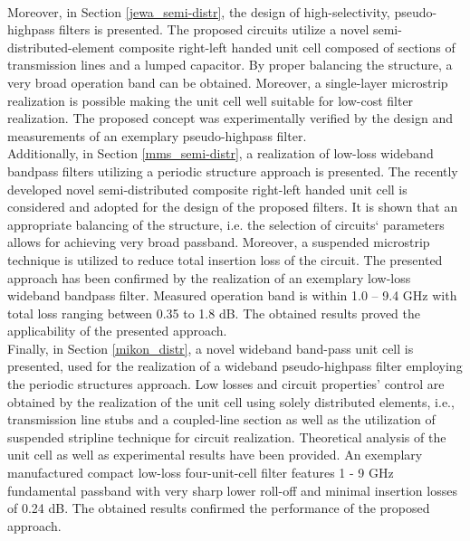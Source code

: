 \\
\indent Moreover, in Section \ref{jewa_semi-distr}, the design of high-selectivity, pseudo-highpass filters is presented. The proposed circuits utilize a novel semi-distributed-element composite right-left handed unit cell composed of sections of transmission lines and a lumped capacitor. By proper balancing the structure, a very broad operation band can be obtained. Moreover, a single-layer microstrip realization is possible making the unit cell well suitable for low-cost filter realization. The proposed concept was experimentally verified by the design and measurements of an exemplary pseudo-highpass filter.
\\
\indent Additionally, in Section \ref{mms_semi-distr}, a realization of low-loss wideband bandpass filters utilizing a periodic structure approach is presented. The recently developed novel semi-distributed composite right-left handed unit cell is considered and adopted for the design of the proposed filters. It is shown that an appropriate balancing of the structure, i.e. the  selection of circuits` parameters allows for achieving very broad passband. Moreover, a suspended microstrip technique is utilized to reduce total insertion loss of the circuit. The presented approach has been confirmed by the realization of an exemplary low-loss wideband bandpass filter. Measured operation band is within 1.0 – 9.4 GHz with total loss ranging between 0.35 to 1.8 dB. The obtained results proved the applicability of the presented approach.
\\
\indent Finally, in Section \ref{mikon_distr}, a novel wideband band-pass unit cell is presented, used for the realization of a wideband pseudo-highpass filter employing the periodic structures approach. Low losses and circuit properties' control are obtained by the realization of the unit cell using solely distributed elements, i.e., transmission line stubs and a coupled-line section as well as the utilization of suspended stripline technique for circuit realization. Theoretical analysis of the unit cell as well as experimental results have been provided. An exemplary manufactured compact low-loss four-unit-cell filter features 1 - 9 GHz fundamental passband with very sharp lower roll-off and minimal insertion losses of 0.24 dB. The obtained results confirmed the performance of the proposed approach.

\cleardoublepage




